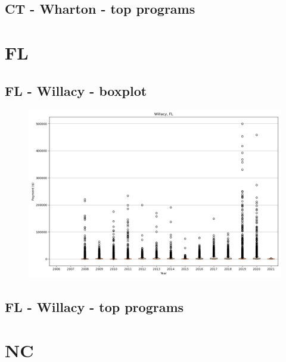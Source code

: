 \subsection*{CT - Wharton - top programs}

\newpage
\section*{FL}
\subsection*{FL - Willacy - boxplot}
\begin{figure}[h]
\centering
\includegraphics[width=7in]{../output/boxplots/counties/Willacy-FL_boxplot.png}
\end{figure}


\subsection*{FL - Willacy - top programs}

\newpage
\section*{NC}
